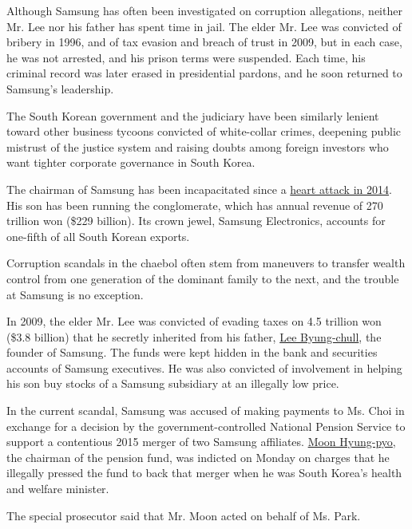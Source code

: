 Although Samsung has often been investigated on corruption allegations,
neither Mr. Lee nor his father has spent time in jail. The elder Mr. Lee
was convicted of bribery in 1996, and of tax evasion and breach of trust
in 2009, but in each case, he was not arrested, and his prison terms
were suspended. Each time, his criminal record was later erased in
presidential pardons, and he soon returned to Samsung's leadership.

The South Korean government and the judiciary have been similarly
lenient toward other business tycoons convicted of white-collar crimes,
deepening public mistrust of the justice system and raising doubts among
foreign investors who want tighter corporate governance in South Korea.

The chairman of Samsung has been incapacitated since a
\href{https://www.nytimes.com/2014/05/12/business/international/samsungs-chairman-has-surgery-after-heart-attack.html}{heart
attack in 2014}. His son has been running the conglomerate, which has
annual revenue of 270 trillion won (\$229 billion). Its crown jewel,
Samsung Electronics, accounts for one-fifth of all South Korean exports.

Corruption scandals in the chaebol often stem from maneuvers to transfer
wealth control from one generation of the dominant family to the next,
and the trouble at Samsung is no exception.

In 2009, the elder Mr. Lee was convicted of evading taxes on 4.5
trillion won (\$3.8 billion) that he secretly inherited from his father,
\href{http://www.nytimes.com/1987/11/20/obituaries/lee-byung-chull-77-industrialist-of-korea.html}{Lee
Byung-chull}, the founder of Samsung. The funds were kept hidden in the
bank and securities accounts of Samsung executives. He was also
convicted of involvement in helping his son buy stocks of a Samsung
subsidiary at an illegally low price.

In the current scandal, Samsung was accused of making payments to Ms.
Choi in exchange for a decision by the government-controlled National
Pension Service to support a contentious 2015 merger of two Samsung
affiliates.
\href{https://www.nytimes.com/2016/12/31/world/asia/south-korea-samsung-merger-moon-hyung-pyo.html}{Moon
Hyung-pyo}, the chairman of the pension fund, was indicted on Monday on
charges that he illegally pressed the fund to back that merger when he
was South Korea's health and welfare minister.

The special prosecutor said that Mr. Moon acted on behalf of Ms. Park.

